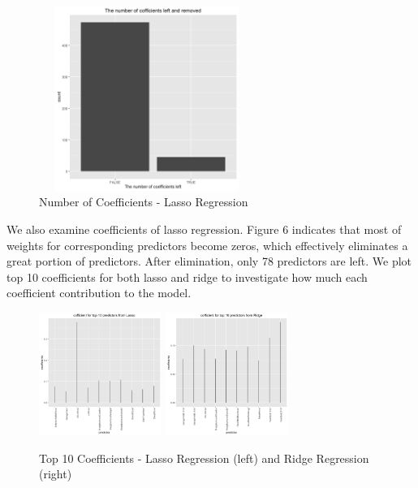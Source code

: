 \documentclass[letterpaper, 10 pt, conference]{ieeeconf}\usepackage[]{graphicx}\usepackage[]{color}
\begin{document}
   \begin{figure}[thpb]
      \centering
      \includegraphics[width =  7cm, height = 6cm]{../images/model_lasso_number_of_coefficients_left.png}
      \caption{Number of Coefficients - Lasso Regression}
      \label{figurelabel}
   \end{figure}

We also examine coefficients of lasso regression. Figure 6 indicates that most of weights for corresponding predictors become zeros, which effectively eliminates a great portion of predictors. After elimination, only 78 predictors are left. We plot top 10 coefficients for both lasso and ridge to investigate how much each coefficient contribution to the model. 

   \begin{figure}[thpb]
      \centering
      \includegraphics[width =  4cm, height = 4cm]{../images/model_lasso_coefficients_top_10.png}
      \includegraphics[width =  4cm, height = 4cm]{../images/model_ridge_coefficients_top_10.png}
      \caption{Top 10 Coefficients - Lasso Regression (left) and Ridge Regression (right)}
      \label{figurelabel}
   \end{figure}
\end{document}
